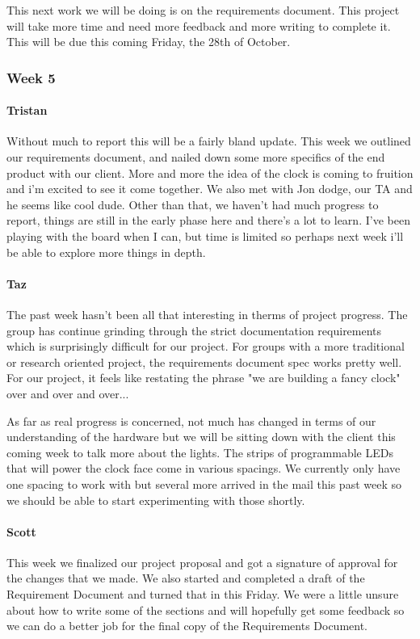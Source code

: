 \documentclass[onecolumn, draftclsnofoot,10pt, compsoc]{IEEEtran}
\begin{document}
This next work we will be doing is on the requirements document. This project will take more time and need more feedback and more writing to complete it. This will be due this coming Friday, the 28th of October.
\subsubsection{Week 5}
\paragraph{Tristan}
Without much to report this will be a fairly bland update. This week we outlined our requirements document, and nailed down some more specifics of the end product with our client. More and more the idea of the clock is coming to fruition and i'm excited to see it come together. We also met with Jon dodge, our TA and he seems like cool dude. Other than that, we haven't had much progress to report, things are still in the early phase here and there's a lot to learn. I've been playing with the board when I can, but time is limited so perhaps next week i'll be able to explore more things in depth.
\paragraph{Taz}
The past week hasn't been all that interesting in therms of project progress. The group has continue grinding through the strict documentation requirements which is surprisingly difficult for our project. For groups with a more traditional or research oriented project, the requirements document spec works pretty well. For our project, it feels like restating the phrase "we are building a fancy clock" over and over and over...

As far as real progress is concerned, not much has changed in terms of our understanding of the hardware but we will be sitting down with the client this coming week to talk more about the lights. The strips of programmable LEDs that will power the clock face come in various spacings. We currently only have one spacing to work with but several more arrived in the mail this past week so we should be able to start experimenting with those shortly.
\paragraph{Scott}
This week we finalized our project proposal and got a signature of approval for the changes that we made. We also started and completed a draft of the Requirement Document and turned that in this Friday. We were a little unsure about how to write some of the sections and will hopefully get some feedback so we can do a better job for the final copy of the Requirements Document.
\end{document}
